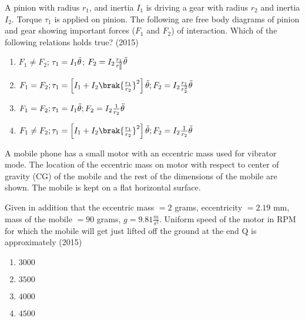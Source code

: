     
    \item A pinion with radius $r_1$, and inertia $I_1$ is driving a gear with radius $r_2$ and inertia $I_2$. Torque $\tau_1$ is applied on pinion. The following are free body diagrams of pinion and gear showing important forces ($F_1$ and $F_2$) of interaction. Which of the following relations holds true?
    \hfill{(2015)}

        

    \begin{enumerate}
        \item $F_1\neq F_2$;
        $\tau_1=I_1\Ddot{\theta} $;
        $ F_2=I_2\frac{r_1}{r_2^2}\Ddot{\theta}$
        \item $F_1= F_2;\tau_1=\left[I_1+I_2\brak{\frac{r_1}{r_2}}^2\right]\Ddot{\theta}; F_2=I_2\frac{r_1}{r_2^2}\Ddot{\theta}$
        \item $F_1= F_2;\tau_1=I_1\Ddot{\theta}; F_2=I_2\frac{1}{r_2}\Ddot{\theta}$
        \item $F_1\neq F_2;\tau_1=\left[I_1+I_2\brak{\frac{r_1}{r_2}}^2\right]\Ddot{\theta}; F_2=I_2\frac{1}{r_2}\Ddot{\theta}$
    \end{enumerate}


    
    \item A mobile phone has a small motor with an eccentric mass used for vibrator mode. The location of the eccentric mass on motor with respect to center of gravity (CG) of the mobile and the rest of the dimensions of the mobile are shown. The mobile is kept on a flat horizontal surface. 

    

    Given in addition that the eccentric mass $=2$ grams, eccentricity $=2.19$ mm, mass of the mobile $=90$ grams, $g=9.81\frac{m}{s^2}$. Uniform speed of the motor in RPM for which the mobile will get just lifted off the ground at the end Q is approximately
    \hfill{(2015)}
    
    \begin{multicols}{4}
    \begin{enumerate}
        \item $3000$
        \item $3500$
        \item $4000$
        \item $4500$
    \end{enumerate}
    \end{multicols}		
